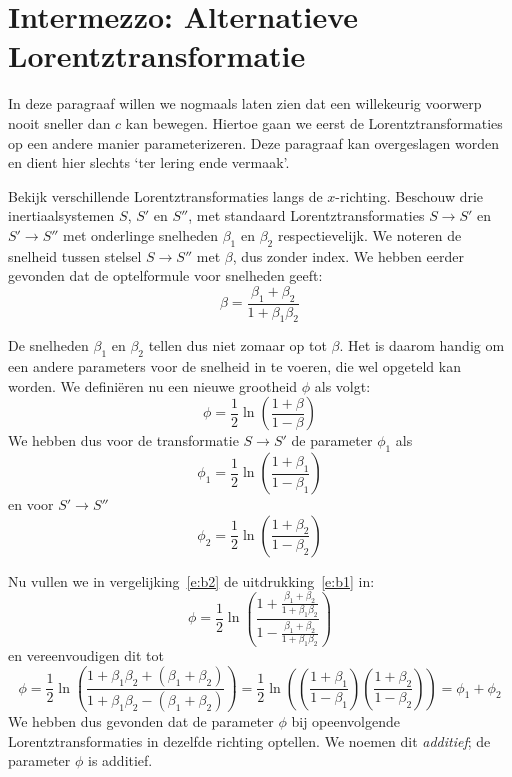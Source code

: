  
\section{Intermezzo: Alternatieve Lorentztransformatie}
In deze paragraaf willen we nogmaals laten zien dat een willekeurig voorwerp nooit sneller dan $c$ kan bewegen. Hiertoe gaan we eerst de Lorentztransformaties op een andere manier parameterizeren. Deze paragraaf kan overgeslagen worden en dient hier slechts `ter lering ende vermaak'.

Bekijk verschillende  Lorentztransformaties langs de $x$-richting.
Beschouw drie inertiaalsystemen $S$, $S'$ en $S''$, met standaard
Lorentztransformaties $S\rightarrow S'$ en $S'\rightarrow S''$ met
onderlinge snelheden $\beta_1$ en $\beta_2$ respectievelijk. We
noteren de snelheid tussen stelsel $S\rightarrow S''$ met $\beta$, dus
zonder index. We hebben eerder gevonden dat de optelformule voor
snelheden geeft:
\begin{equation}\label{e:b1}
\beta = \frac{\beta_1  + \beta_2 }{1+\beta_1 \beta_2}  
\end{equation}

De snelheden $\beta_1$ en $\beta_2$ tellen dus niet zomaar op tot
$\beta$. Het is daarom handig om een andere parameters voor de
snelheid in te voeren, die wel opgeteld kan worden.  We
defini\"eren nu een nieuwe grootheid $\phi$ als volgt:
\begin{equation}\label{e:b2}
\phi = \frac{1}{2}\ln\left(\frac{1+\beta}{1-\beta}\right)
\end{equation}
We hebben dus voor de transformatie $S\rightarrow S'$ de parameter $\phi_1$ als
\[
\phi_1 = \frac{1}{2}\ln\left(\frac{1+\beta_1}{1-\beta_1}\right)
\]
en voor $S'\rightarrow S''$
\[
\phi_2 = \frac{1}{2}\ln\left(\frac{1+\beta_2}{1-\beta_2}\right)
\]

Nu vullen we in vergelijking~\ref{e:b2} de uitdrukking~\ref{e:b1} in:
\begin{equation}
\phi = \frac{1}{2}\ln\left( \frac{1+ \frac{\beta_1 + \beta_2}{1+\beta_1 \beta_2}}{1-\frac{\beta_1 + \beta_2}{1+\beta_1 \beta_2}  }\right)  
\end{equation}
en vereenvoudigen dit tot
\begin{equation}
\phi = \frac{1}{2}\ln\left( \frac{1+ \beta_1 \beta_2 + (\beta_1 + \beta_2)}{1 + \beta_1 \beta_2 -(\beta_1 + \beta_2)}  \right) = \frac{1}{2}\ln\left(\left(\frac{1+\beta_1}{1-\beta_1}\right)  \left(\frac{1+\beta_2}{1-\beta_2}\right)\right) = \phi_1 + \phi_2  
\end{equation}
We hebben dus gevonden dat de parameter $\phi$ bij opeenvolgende Lorentztransformaties in dezelfde richting optellen. We noemen dit {\it additief}; de parameter $\phi$ is additief. 

